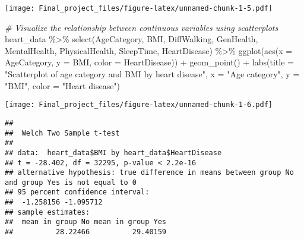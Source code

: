 \documentclass[
]{article}
\newenvironment{Shaded}{\begin{snugshade}}{\end{snugshade}}
\newcommand{\AttributeTok}[1]{\textcolor[rgb]{0.77,0.63,0.00}{#1}}
\newcommand{\CommentTok}[1]{\textcolor[rgb]{0.56,0.35,0.01}{\textit{#1}}}
\newcommand{\FunctionTok}[1]{\textcolor[rgb]{0.00,0.00,0.00}{#1}}
\newcommand{\NormalTok}[1]{#1}
\newcommand{\SpecialCharTok}[1]{\textcolor[rgb]{0.00,0.00,0.00}{#1}}
\newcommand{\StringTok}[1]{\textcolor[rgb]{0.31,0.60,0.02}{#1}}
\begin{document}
\texttt{[image: Final\_project\_files/figure-latex/unnamed-chunk-1-5.pdf]}

\begin{Shaded}
\begin{Highlighting}[]
\CommentTok{\# Visualize the relationship between continuous variables using scatterplots}
\NormalTok{heart\_data }\SpecialCharTok{\%\textgreater{}\%} 
  \FunctionTok{select}\NormalTok{(AgeCategory, BMI, DiffWalking, GenHealth, MentalHealth, PhysicalHealth, SleepTime, HeartDisease) }\SpecialCharTok{\%\textgreater{}\%} 
  \FunctionTok{ggplot}\NormalTok{(}\FunctionTok{aes}\NormalTok{(}\AttributeTok{x =}\NormalTok{ AgeCategory, }\AttributeTok{y =}\NormalTok{ BMI, }\AttributeTok{color =}\NormalTok{ HeartDisease)) }\SpecialCharTok{+}
  \FunctionTok{geom\_point}\NormalTok{() }\SpecialCharTok{+}
  \FunctionTok{labs}\NormalTok{(}\AttributeTok{title =} \StringTok{"Scatterplot of age category and BMI by heart disease"}\NormalTok{, }
       \AttributeTok{x =} \StringTok{"Age category"}\NormalTok{, }\AttributeTok{y =} \StringTok{"BMI"}\NormalTok{, }\AttributeTok{color =} \StringTok{"Heart disease"}\NormalTok{)}
\end{Highlighting}
\end{Shaded}

\texttt{[image: Final\_project\_files/figure-latex/unnamed-chunk-1-6.pdf]}

\begin{Shaded}
\end{Shaded}

\begin{verbatim}
## 
##  Welch Two Sample t-test
## 
## data:  heart_data$BMI by heart_data$HeartDisease
## t = -28.402, df = 32295, p-value < 2.2e-16
## alternative hypothesis: true difference in means between group No and group Yes is not equal to 0
## 95 percent confidence interval:
##  -1.258156 -1.095712
## sample estimates:
##  mean in group No mean in group Yes 
##          28.22466          29.40159
\end{verbatim}
\end{document}
